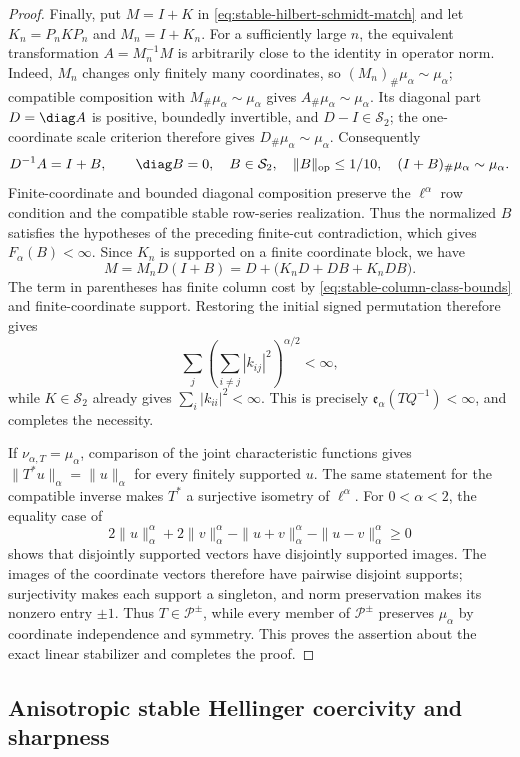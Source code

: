 \begin{proof}
Finally, put \(M=I+K\) in
\eqref{eq:stable-hilbert-schmidt-match} and let
\(K_n=P_nKP_n\) and \(M_n=I+K_n\).
For a sufficiently large \(n\), the equivalent transformation
\(A=M_n^{-1}M\) is arbitrarily close to the identity in operator norm.
Indeed, \(M_n\) changes only finitely many coordinates, so
\((M_n)_\#\mu_\alpha\sim\mu_\alpha\); compatible composition with
\(M_\#\mu_\alpha\sim\mu_\alpha\) gives
\(A_\#\mu_\alpha\sim\mu_\alpha\).
Its diagonal part \(D=\diag A\) is positive, boundedly invertible, and
\(D-I\in\mathcal S_2\); the one-coordinate scale criterion therefore gives
\(D_\#\mu_\alpha\sim\mu_\alpha\).
Consequently
\[
 D^{-1}A=I+B,
 \qquad
 \diag B=0,\quad B\in\mathcal S_2,\quad
 \|B\|_{\mathrm{op}}\le1/10,\quad
 (I+B)_\#\mu_\alpha\sim\mu_\alpha.
\]
Finite-coordinate and bounded diagonal composition preserve the
\(\ell^\alpha\) row condition and the compatible stable row-series
realization.  Thus the normalized \(B\) satisfies the hypotheses of the
preceding finite-cut contradiction, which gives \(F_\alpha(B)<\infty\).
Since \(K_n\) is supported on a finite coordinate block, we have
\[
 M=M_nD(I+B)
  =D+\bigl(K_nD+DB+K_nDB\bigr).
\]
The term in parentheses has finite column cost by
\eqref{eq:stable-column-class-bounds} and finite-coordinate support.
Restoring the initial signed permutation therefore gives
\[
 \sum_j\left(\sum_{i\ne j}|k_{ij}|^2\right)^{\alpha/2}<\infty,
\]
while \(K\in\mathcal S_2\) already gives
\(\sum_i|k_{ii}|^2<\infty\).
This is precisely \(\mathfrak e_\alpha(TQ^{-1})<\infty\), and completes
the necessity.

If \(\nu_{\alpha,T}=\mu_\alpha\), comparison of the joint characteristic
functions gives
\(\|T^*u\|_\alpha=\|u\|_\alpha\) for every finitely supported \(u\).
The same statement for the compatible inverse makes \(T^*\) a surjective
isometry of \(\ell^\alpha\).
For \(0<\alpha<2\), the equality case of
\[
 2\|u\|_\alpha^\alpha+2\|v\|_\alpha^\alpha
 -\|u+v\|_\alpha^\alpha-\|u-v\|_\alpha^\alpha\ge0
\]
shows that disjointly supported vectors have disjointly supported images.
The images of the coordinate vectors therefore have pairwise disjoint
supports; surjectivity makes each support a singleton, and norm preservation
makes its nonzero entry \(\pm1\).
Thus \(T\in\mathcal P^{\pm}\), while every member of \(\mathcal P^{\pm}\)
preserves \(\mu_\alpha\) by coordinate independence and symmetry.  This proves
the assertion about the exact linear
stabilizer and completes the proof.
\end{proof}

\subsection{Anisotropic stable Hellinger coercivity and sharpness}
\label{sec:anisotropic-stable-hellinger-coercivity-and-sharpness}


